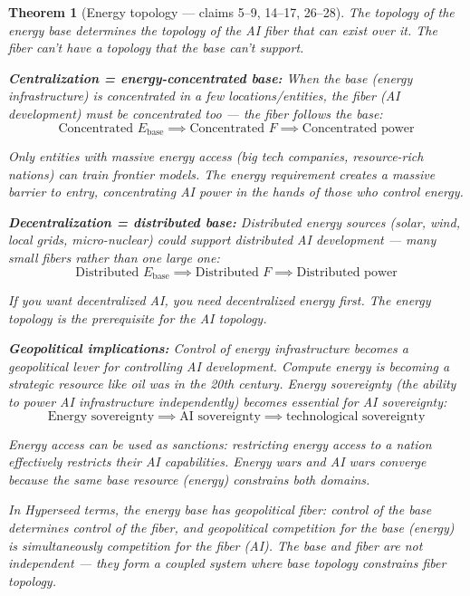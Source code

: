 \documentclass[11pt,a4paper]{article}
\newtheorem{theorem}[definition]{Theorem}
\begin{document}
\begin{theorem}[Energy topology --- claims 5--9, 14--17, 26--28]
\label{thm:topology}
The topology of the energy base determines the topology of the AI fiber
that can exist over it. The fiber can't have a topology that the base
can't support.

\textbf{Centralization = energy-concentrated base:}
When the base (energy infrastructure) is concentrated in a few
locations/entities, the fiber (AI development) must be concentrated
too --- the fiber follows the base:
\[
  \text{Concentrated } E_{\text{base}} \implies
  \text{Concentrated } F \implies \text{Concentrated power}
\]

Only entities with massive energy access (big tech companies,
resource-rich nations) can train frontier models. The energy requirement
creates a massive barrier to entry, concentrating AI power in the hands
of those who control energy.

\textbf{Decentralization = distributed base:}
Distributed energy sources (solar, wind, local grids, micro-nuclear)
could support distributed AI development --- many small fibers rather
than one large one:
\[
  \text{Distributed } E_{\text{base}} \implies
  \text{Distributed } F \implies \text{Distributed power}
\]

If you want decentralized AI, you need decentralized energy first. The
energy topology is the prerequisite for the AI topology.

\textbf{Geopolitical implications:}
Control of energy infrastructure becomes a geopolitical lever for
controlling AI development. Compute energy is becoming a strategic
resource like oil was in the 20th century. Energy sovereignty (the
ability to power AI infrastructure independently) becomes essential
for AI sovereignty:
\[
  \text{Energy sovereignty} \implies \text{AI sovereignty}
  \implies \text{technological sovereignty}
\]

Energy access can be used as sanctions: restricting energy access to
a nation effectively restricts their AI capabilities. Energy wars and
AI wars converge because the same base resource (energy) constrains
both domains.

In Hyperseed terms, the energy base has geopolitical fiber: control of
the base determines control of the fiber, and geopolitical competition
for the base (energy) is simultaneously competition for the fiber (AI).
The base and fiber are not independent --- they form a coupled system
where base topology constrains fiber topology.
\end{theorem}
\end{document}
